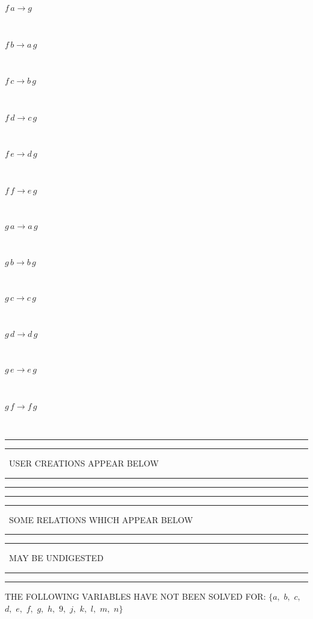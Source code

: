 \documentclass[rep10,leqno]{report}
\begin{document}
\begin{minipage}{6in}
$
f\,
 a\rightarrow g
$
\end{minipage}\medskip \\
\begin{minipage}{6in}
$
f\,
 b\rightarrow a\,
 g
$
\end{minipage}\medskip \\
\begin{minipage}{6in}
$
f\,
 c\rightarrow b\,
 g
$
\end{minipage}\medskip \\
\begin{minipage}{6in}
$
f\,
 d\rightarrow c\,
 g
$
\end{minipage}\medskip \\
\begin{minipage}{6in}
$
f\,
 e\rightarrow d\,
 g
$
\end{minipage}\medskip \\
\begin{minipage}{6in}
$
f\,
 f\rightarrow e\,
 g
$
\end{minipage}\medskip \\
\begin{minipage}{6in}
$
g\,
 a\rightarrow a\,
 g
$
\end{minipage}\medskip \\
\begin{minipage}{6in}
$
g\,
 b\rightarrow b\,
 g
$
\end{minipage}\medskip \\
\begin{minipage}{6in}
$
g\,
 c\rightarrow c\,
 g
$
\end{minipage}\medskip \\
\begin{minipage}{6in}
$
g\,
 d\rightarrow d\,
 g
$
\end{minipage}\medskip \\
\begin{minipage}{6in}
$
g\,
 e\rightarrow e\,
 g
$
\end{minipage}\medskip \\
\begin{minipage}{6in}
$
g\,
 f\rightarrow f\,
 g
$
\end{minipage}\\
\rule[2pt]{6in}{1pt}\hfil\break
\rule[2.5pt]{1.701in}{1pt}
\ USER CREATIONS APPEAR BELOW\ 
\rule[2.5pt]{1.701in}{1pt}\hfil\break
\rule[2pt]{6in}{1pt}\hfil\break
\rule[2pt]{6in}{4pt}\hfil\break
\rule[2pt]{1.45in}{4pt}
\ SOME RELATIONS WHICH APPEAR BELOW\ 
\rule[2pt]{1.45in}{4pt}\hfil\break
\rule[2pt]{2.18in}{4pt}
\ MAY BE UNDIGESTED\ 
\rule[2pt]{2.18in}{4pt}\hfil\break
\rule[2pt]{6in}{4pt}\hfil\break
THE FOLLOWING VARIABLES HAVE NOT BEEN SOLVED FOR:\hfil\break
$\{a,
$ $
b,
$ $
c,
$ $
d,
$ $
e,
$ $
f,
$ $
g,
$ $
h,
$ $
9,
$ $
j,
$ $
k,
$ $
l,
$ $
m,
$ $
n\}$
\smallskip\\
\vspace{10pt}
\end{document}
